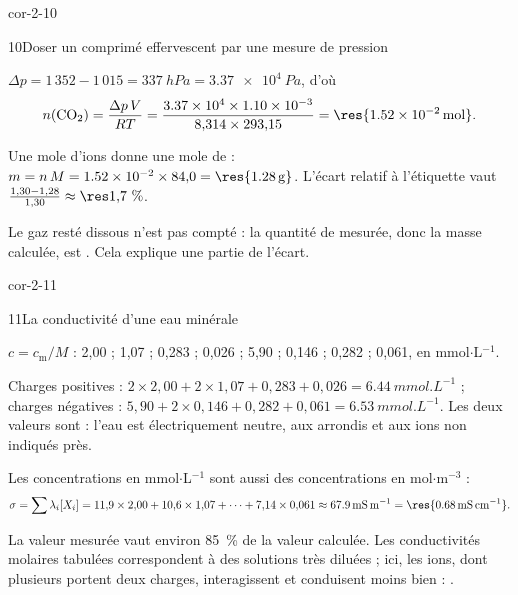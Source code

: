\begin{blocLivre}{cor-2-10}
\begin{corrige}{10}{Doser un comprimé effervescent par une mesure de pression}
\begin{questions}
\item $\Delta p=1\,352-1\,015=\qty{337}{hPa}=\qty{3,37e4}{Pa}$, d'où
\[n(\ce{CO2})=\frac{\Delta p\,V}{RT}=\frac{\num{3.37e4}\times\num{1.10e-3}}{8{,}314\times293{,}15}=\res{\qty{1,52e-2}{mol}}.\]
\item Une mole d'ions  donne une mole de  : $m=n\,M=\num{1.52e-2}\times84{,}0=\res{\qty{1,28}{g}}$.
L'écart relatif à l'étiquette vaut $\frac{1{,}30-1{,}28}{1{,}30}\approx\res{1{,}7~\%}$.
\item Le gaz resté dissous n'est pas compté : la quantité de  mesurée, donc la masse calculée, est
. Cela explique une partie de l'écart.
\end{questions}
\end{corrige}
\end{blocLivre}
\begin{blocLivre}{cor-2-11}
\begin{corrige}{11}{La conductivité d'une eau minérale}
\begin{questions}
\item $c=c_\mathrm{m}/M$ :  2,00 ;  1,07 ;  0,283 ;  0,026 ;  5,90 ;
 0,146 ;  0,282 ;  0,061, en mmol$\cdot$L$^{-1}$.
\item Charges positives : $2\times2{,}00+2\times1{,}07+0{,}283+0{,}026=\qty{6,44}{mmol.L^{-1}}$ ; charges négatives :
$5{,}90+2\times0{,}146+0{,}282+0{,}061=\qty{6,53}{mmol.L^{-1}}$. Les deux valeurs sont  :
l'eau est électriquement neutre, aux arrondis et aux ions non indiqués près.
\item Les concentrations en mmol$\cdot$L$^{-1}$ sont aussi des concentrations en mol$\cdot$m$^{-3}$ :
\[\sigma=\sum\lambda_i[X_i]=11{,}9\times2{,}00+10{,}6\times1{,}07+\dots+7{,}14\times0{,}061\approx\qty{67,9}{mS.m^{-1}}=\res{\qty{0,68}{mS.cm^{-1}}}.\]
\item La valeur mesurée vaut environ 85~\% de la valeur calculée. Les conductivités molaires tabulées correspondent
à des solutions très diluées ; ici, les ions, dont plusieurs portent deux charges, interagissent et conduisent
moins bien : .
\end{questions}
\end{corrige}
\end{blocLivre}
